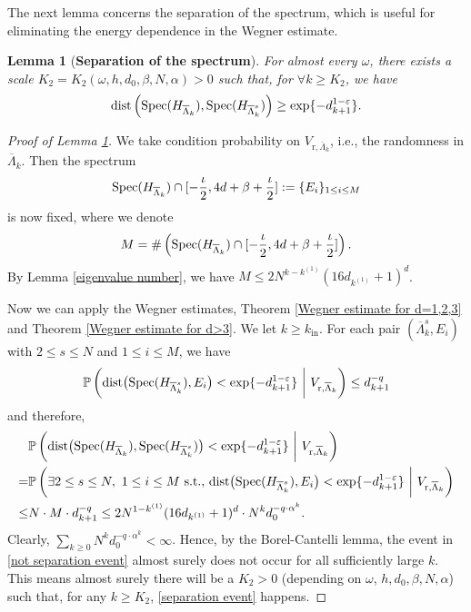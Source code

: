 \documentclass[11pt,reqno,UTF8,twoside]{amsart}
\newcommand{\spec}{{\rm Spec}}
\newcommand{\barLambda}{\overline{\Lambda}}
\renewcommand{\P}{\mathbb{P}}
\newcommand{\dist}{{\rm dist}}
\newtheorem{lem}[thm]{Lemma}
\theoremstyle{definition}
\numberwithin{equation}{section}
\begin{document}
The next  lemma  concerns the separation of the spectrum, which is useful for  eliminating  the energy dependence in the Wegner estimate.
\begin{lem}[{\bf Separation of the spectrum}]\label{separation of spectrum lemma}
For almost every $\omega$,  there exists  a scale $K_2=K_2(\omega,h,d_0,\beta,N,\alpha)>0$ such that, for $\forall k\geq K_2$, we have 
  \begin{equation}\label{separation event}
    \dist\left( \spec(H_{\barLambda_k}),\spec(H_{\barLambda^s_k})\right)\geq \exp \{-d_{k+1}^{1-\varepsilon} \}.
  \end{equation}
\end{lem}
\begin{proof}[Proof of Lemma \ref{separation of spectrum lemma}]
  We take condition probability  on $V_{\text{r},\barLambda_k}$, i.e.,  the randomness in $\barLambda_k$. Then the spectrum 
  \[\spec(H_{\barLambda_k})\cap [-\frac{\iota}{2},4d+\beta+\frac{\iota}{2}]:= \{E_{i}\}_{1\leq i\leq M}\]
  is now fixed, where we denote
  \[M=\# \left(    \spec(H_{\barLambda_k})\cap [-\frac{\iota}{2},4d+\beta+\frac{\iota}{2}]  \right).\]
  By Lemma \ref{eigenvalue number}, we have $M\leq 2 N^{k-k^{(1)}} (16d_{k^{(1)}}+1)^{d}$.


  Now we can apply the Wegner estimates, Theorem \ref{Wegner estimate for d=1,2,3} and Theorem \ref{Wegner estimate for d>3}. We let $k\geq k_{\text{in}}$. For each pair $(\barLambda_k^s,E_i)$ with $2\leq s\leq N$ and $1\leq i\leq M$,  we have 
  \[ \P\left( \dist\big(\spec(H_{\barLambda_k^s}), E_i \big) < \exp\{-d_{k+1}^{1-\varepsilon}\} \ \bigg| \ V_{\text{r},\barLambda_k}   \right) \leq d_{k+1}^{-q}  \]
  and therefore, 
  \begin{align}\label{not separation event}
    &\P\left(\dist\big( \spec(H_{\barLambda_k}),\spec(H_{\barLambda^s_k})\big)< \exp \{-d_{k+1}^{1-\varepsilon} \}  \ \bigg| \ V_{\text{r},\barLambda_k} \right) \\
    \notag =&\P\left( \exists2\leq s\leq N, \ 1\leq i\leq M \ {\rm s.t.,} \ \dist\big(\spec(H_{\barLambda_k^s}), E_i \big) < \exp\{-d_{k+1}^{1-\varepsilon}\} \ \bigg| \ V_{\text{r},\barLambda_k} \right) \\
    \notag \leq & N\cdot M\cdot d_{k+1}^{-q} \leq 2 N^{1-k^{(1)}} (16d_{k^{(1)}}+1)^{d} \cdot N^k d_0^{-q\cdot \alpha^k}.
  \end{align}
  Clearly, $\sum\limits_{k\geq 0} N^k d_0^{-q\cdot \alpha^k}<\infty$. Hence, by the Borel-Cantelli lemma, the event in \eqref{not separation event} almost surely does not occur for all sufficiently large $k$. This means almost surely there will be a $K_2>0$ (depending  on $\omega$, $h,d_0,\beta,N,\alpha$) such that,  for any $k\geq K_2$, \eqref{separation event} happens.

\end{proof}
\end{document}
